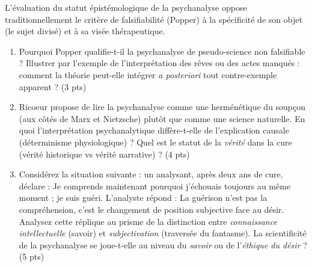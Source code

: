 \documentclass[11pt]{article}
\begin{document}
\begin{exercice}
L'évaluation du statut épistémologique de la psychanalyse oppose traditionnellement le critère de falsifiabilité (Popper) à la spécificité de son objet (le sujet divisé) et à sa visée thérapeutique.
\begin{enumerate}
    \item Pourquoi Popper qualifie-t-il la psychanalyse de \og pseudo-science\fg{} non falsifiable ? Illustrer par l'exemple de l'interprétation des rêves ou des actes manqués : comment la théorie peut-elle intégrer \textit{a posteriori} tout contre-exemple apparent ? (3 pts)
    \item Ricoeur propose de lire la psychanalyse comme une \og herménétique du soupçon\fg{} (aux côtés de Marx et Nietzsche) plutôt que comme une science naturelle. En quoi l'interprétation psychanalytique diffère-t-elle de l'explication causale (déterminisme physiologique) ? Quel est le statut de la \textit{vérité} dans la cure (vérité historique vs vérité narrative) ? (4 pts)
    \item Considérez la situation suivante : un analysant, après deux ans de cure, déclare : \og Je comprends maintenant pourquoi j'échouais toujours au même moment ; je suis guéri.\fg{} L'analyste répond : \og La guérison n'est pas la compréhension, c'est le changement de position subjective face au désir.\fg{} Analysez cette réplique au prisme de la distinction entre \textit{connaissance intellectuelle} (savoir) et \textit{subjectivation} (traversée du fantasme). La scientificité de la psychanalyse se joue-t-elle au niveau du \textit{savoir} ou de l'\textit{éthique du désir} ? (5 pts)
\end{enumerate}
\end{exercice}
\end{document}
